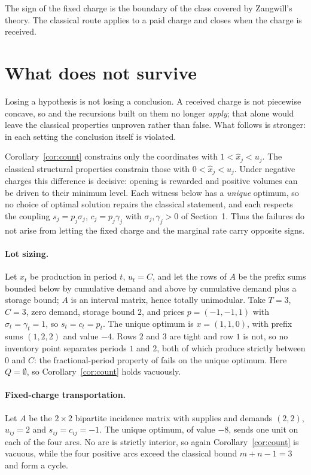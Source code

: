 \documentclass[3p,11pt]{elsarticle}
\theoremstyle{remark}
\theoremstyle{definition}
\begin{document}
The sign of the fixed charge is the boundary of the class covered by Zangwill's theory.
The classical route applies to a paid charge and closes when the charge is received.

\section{What does not survive}\label{sec:fails}

Losing a hypothesis is not losing a conclusion. A received charge is not piecewise
concave, so \cite{fk71,love73} and the recursions built on them no longer \emph{apply};
that alone would leave the classical properties unproven rather than false. What follows
is stronger: in each setting the conclusion itself is violated.

Corollary~\ref{cor:count} constrains only the coordinates with $1<\hat x_j<u_j$. The
classical structural properties constrain those with $0<\hat x_j<u_j$. Under negative
charges this difference is decisive: opening is rewarded and positive volumes can be
driven to their minimum level. Each witness below has a
\emph{unique} optimum, so no choice of optimal solution repairs the classical statement,
and each respects the coupling $s_j=p_j\sigma_j$, $c_j=p_j\gamma_j$ with
$\sigma_j,\gamma_j>0$ of Section~1. Thus the failures do not arise from letting the
fixed charge and the marginal rate carry opposite signs.

\paragraph{Lot sizing.} Let $x_t$ be production in period $t$, $u_t=C$, and let the rows
of $A$ be the prefix sums bounded below by cumulative demand and above by cumulative
demand plus a storage bound; $A$ is an interval matrix, hence totally unimodular. Take
$T=3$, $C=3$, zero demand, storage bound $2$, and prices $p=(-1,-1,1)$ with
$\sigma_t=\gamma_t=1$, so $s_t=c_t=p_t$. The unique optimum is $x=(1,1,0)$, with prefix
sums $(1,2,2)$ and value $-4$. Rows $2$ and $3$ are tight and row $1$ is not, so no
inventory point separates periods $1$ and $2$, both of which produce strictly between $0$
and $C$: the fractional-period property of \cite{fk71,love73} fails on the unique
optimum. Here $Q=\emptyset$, so Corollary~\ref{cor:count} holds vacuously.

\paragraph{Fixed-charge transportation.} Let $A$ be the $2\times2$ bipartite incidence
matrix with supplies and demands $(2,2)$, $u_{ij}=2$ and $s_{ij}=c_{ij}=-1$. The unique
optimum, of value $-8$, sends one unit on each of the four arcs. No arc is strictly interior, so
again Corollary~\ref{cor:count} is vacuous, while the four positive arcs exceed the
classical bound $m+n-1=3$ and form a cycle.
\end{document}
